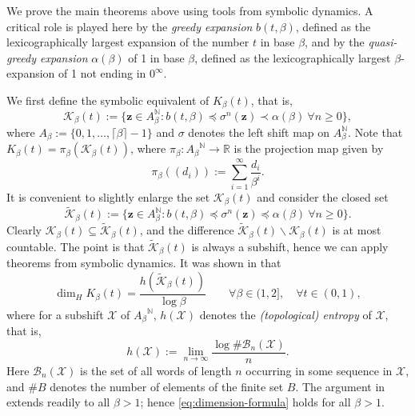 \documentclass[11pt]{amsart}
\theoremstyle{definition}
\theoremstyle{remark}
\numberwithin{equation}{section}
\newcommand{\R}{\ensuremath{\mathbb{R}}}
\newcommand{\N}{\ensuremath{\mathbb{N}}}
\newcommand{\Kt}{\widetilde{\mathcal{K}}}
\newcommand{\z}{\mathbf{z}}
\newcommand{\f}{\infty}
\newcommand{\al}{\alpha}
\newcommand{\lle}{\preccurlyeq}
\newcommand{\si}{\sigma}
\begin{document}
We prove the main theorems above using tools from symbolic dynamics. A critical role is played here by the {\em greedy expansion} $b(t,\beta)$, defined as the lexicographically largest expansion of the number $t$ in base $\beta$, and by the {\em quasi-greedy expansion} $\al(\beta)$ of 1 in base $\beta$, defined as the lexicographically largest $\beta$-expansion of 1 not ending in $0^\f$.

We first define the symbolic equivalent of $K_\beta(t)$, that is,
\[
\mathcal{K}_\beta(t):=\{\z\in {A_\beta^\N}: b(t,\beta)\lle \sigma^n(\z)\prec \alpha(\beta)\ \forall n\geq 0\},
\]
where {$A_\beta:=\{0,1,\dots,\lceil\beta\rceil-1\}$ and} $\si$ denotes the left shift map on {$A_\beta^{\N}$}.
Note that $K_\beta(t)=\pi_\beta(\mathcal{K}_\beta(t))$, where $\pi_\beta:{A_\beta}^\N\to\R$ is the projection map given by
\[
\pi_\beta((d_i)):=\sum_{i=1}^\f \frac{d_i}{\beta^i}.
\]
It is convenient to slightly enlarge the set $\mathcal{K}_\beta(t)$ and consider the closed set
\[
\Kt_\beta(t):=\{\z\in {A_\beta^\N}: b(t,\beta)\lle \sigma^n(\z)\lle \alpha(\beta)\ \forall n\geq 0\}.
\]
Clearly $\mathcal{K}_\beta(t)\subseteq \Kt_\beta(t)$, and the difference $\Kt_\beta(t)\backslash \mathcal{K}_\beta(t)$ is at most countable. The point is that $\Kt_\beta(t)$ is always a subshift, hence we can apply theorems from symbolic dynamics. It was shown in \cite{Kalle-Kong-Langeveld-Li-18} that
\begin{equation} \label{eq:dimension-formula}
\dim_H K_\beta(t)=\frac{h(\Kt_\beta(t))}{\log\beta} \qquad\forall \beta\in(1,2], \quad \forall t\in(0,1),
\end{equation}
where for a subshift $\mathcal{X}$ of ${A_\beta}^\N$, $h(\mathcal{X})$ denotes the {\em (topological) entropy} of $\mathcal{X}$, that is,
\[
h(\mathcal{X}):=\lim_{n\to\f} {\frac{\log\#\mathcal{B}_n(\mathcal{X})}{ n}}.
\]
Here $\mathcal{B}_n(\mathcal{X})$ is the set of all words of length $n$ occurring in some sequence in $\mathcal{X}$, and $\#B$ denotes the number of elements of the finite set $B$. {The argument in \cite{Kalle-Kong-Langeveld-Li-18} extends readily to all $\beta>1$; hence \eqref{eq:dimension-formula} holds for all $\beta>1$.}
\end{document}

